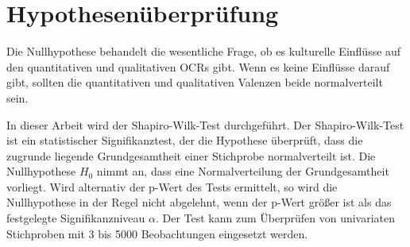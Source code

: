 \section{Hypothesenüberprüfung} \label{sec:h0}
Die Nullhypothese behandelt die wesentliche Frage, ob es kulturelle Einflüsse auf den quantitativen und qualitativen \ac{OCRs} gibt. Wenn es keine Einflüsse darauf gibt, sollten die quantitativen und qualitativen Valenzen beide normalverteilt sein. 

In dieser Arbeit wird der Shapiro-Wilk-Test durchgeführt. Der Shapiro-Wilk-Test ist ein statistischer Signifikanztest, der die Hypothese überprüft, dass die zugrunde liegende Grundgesamtheit einer Stichprobe normalverteilt ist. Die Nullhypothese $H_0$ nimmt an, dass eine Normalverteilung der Grundgesamtheit vorliegt. Wird alternativ der p-Wert des Tests ermittelt, so wird die Nullhypothese in der Regel nicht abgelehnt, wenn der p-Wert größer ist als das festgelegte Signifikanzniveau $\alpha$. Der Test kann zum Überprüfen von univariaten Stichproben mit 3 bis 5000 Beobachtungen eingesetzt werden. \citep{SHAPIRO01121965}

